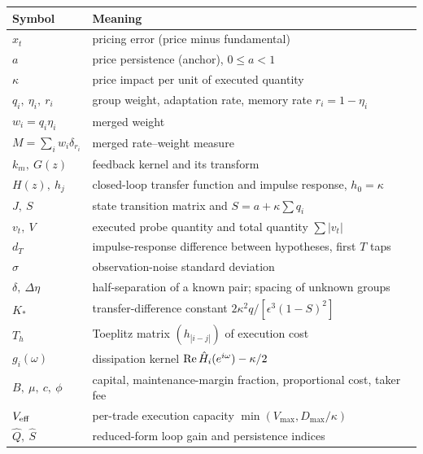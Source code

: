 \documentclass[12pt]{article}
\theoremstyle{definition}
\theoremstyle{remark}
\begin{document}
\begin{longtable}{p{}p{}}
\toprule
Symbol & Meaning\\
\midrule
\endhead
$x_t$ & pricing error (price minus fundamental)\\
$a$ & price persistence (anchor), $0\le a<1$\\
$\kappa$ & price impact per unit of executed quantity\\
$q_i,\ \eta_i,\ r_i$ & group weight, adaptation rate, memory rate $r_i=1-\eta_i$\\
$w_i=q_i\eta_i$ & merged weight\\
$M=\sum_iw_i\delta_{r_i}$ & merged rate--weight measure\\
$k_m,\ G(z)$ & feedback kernel and its transform\\
$H(z),\ h_j$ & closed-loop transfer function and impulse response, $h_0=\kappa$\\
$J,\ S$ & state transition matrix and $S=a+\kappa\sum q_i$\\
$v_t,\ V$ & executed probe quantity and total quantity $\sum|v_t|$\\
$d_T$ & impulse-response difference between hypotheses, first $T$ taps\\
$\sigma$ & observation-noise standard deviation\\
$\delta,\ \Delta\eta$ & half-separation of a known pair; spacing of unknown groups\\
$K_*$ & transfer-difference constant $2\kappa^2q/[\epsilon^3(1-S)^2]$\\
$T_h$ & Toeplitz matrix $(h_{|i-j|})$ of execution cost\\
$g_i(\omega)$ & dissipation kernel ${\rm Re}\,\hat H_i(e^{i\omega})-\kappa/2$\\
$B,\ \mu,\ c,\ \phi$ & capital, maintenance-margin fraction, proportional cost, taker fee\\
$V_{\rm eff}$ & per-trade execution capacity $\min(V_{\max},D_{\max}/\kappa)$\\
$\hat Q,\ \hat S$ & reduced-form loop gain and persistence indices\\
\bottomrule
\end{longtable}
\end{document}
